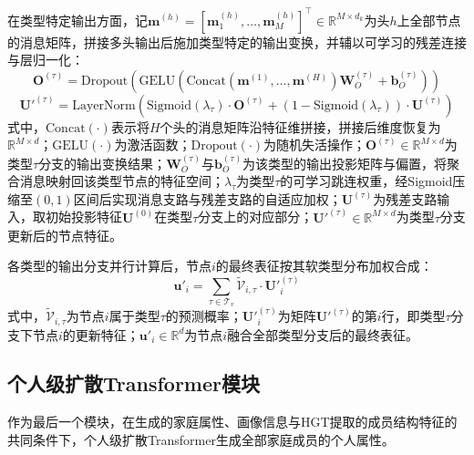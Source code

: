在类型特定输出方面，记$\mathbf{m}^{(h)} = \left[\mathbf{m}_1^{(h)}, \ldots, \mathbf{m}_M^{(h)}\right]^{\top} \in \mathbb{R}^{M \times d_k}$为头$h$上全部节点的消息矩阵，拼接多头输出后施加类型特定的输出变换，并辅以可学习的残差连接与层归一化：
\begin{equation}
  \mathbf{O}^{(\tau)} = \mathrm{Dropout}\left(\mathrm{GELU}\left(\mathrm{Concat}\left(\mathbf{m}^{(1)}, \ldots, \mathbf{m}^{(H)}\right) \mathbf{W}_O^{(\tau)} + \mathbf{b}_O^{(\tau)}\right)\right)
  \label{eq.popsyn.hgtout}
\end{equation}
\begin{equation}
  \mathbf{U}'^{(\tau)} = \mathrm{LayerNorm}\left(\mathrm{Sigmoid}(\lambda_{\tau}) \cdot \mathbf{O}^{(\tau)} + \left(1 - \mathrm{Sigmoid}(\lambda_{\tau})\right) \cdot \mathbf{U}^{(\tau)}\right)
  \label{eq.popsyn.hgtres}
\end{equation}
式中，$\mathrm{Concat}(\cdot)$表示将$H$个头的消息矩阵沿特征维拼接，拼接后维度恢复为$\mathbb{R}^{M \times d}$；$\mathrm{GELU}(\cdot)$为激活函数；$\mathrm{Dropout}(\cdot)$为随机失活操作；$\mathbf{O}^{(\tau)} \in \mathbb{R}^{M \times d}$为类型$\tau$分支的输出变换结果；$\mathbf{W}_O^{(\tau)}$与$\mathbf{b}_O^{(\tau)}$为该类型的输出投影矩阵与偏置，将聚合消息映射回该类型节点的特征空间；$\lambda_{\tau}$为类型$\tau$的可学习跳连权重，经Sigmoid压缩至$(0, 1)$区间后实现消息支路与残差支路的自适应加权；$\mathbf{U}^{(\tau)}$为残差支路输入，取初始投影特征$\mathbf{U}^{(0)}$在类型$\tau$分支上的对应部分；$\mathbf{U}'^{(\tau)} \in \mathbb{R}^{M \times d}$为类型$\tau$分支更新后的节点特征。

 
各类型的输出分支并行计算后，节点$i$的最终表征按其软类型分布加权合成：
\begin{equation}
  \mathbf{u}'_i = \sum_{\tau \in \mathcal{T}_v} \tilde{\mathcal{V}}_{i, \tau} \cdot \mathbf{U}'^{(\tau)}_i
  \label{eq.popsyn.hgtfinal}
\end{equation}
式中，$\tilde{\mathcal{V}}_{i, \tau}$为节点$i$属于类型$\tau$的预测概率；$\mathbf{U}'^{(\tau)}_i$为矩阵$\mathbf{U}'^{(\tau)}$的第$i$行，即类型$\tau$分支下节点$i$的更新特征；$\mathbf{u}'_i \in \mathbb{R}^{d}$为节点$i$融合全部类型分支后的最终表征。
 
\subsection{个人级扩散Transformer模块}\label{subsec.popsyn.model.inddit}
 
作为最后一个模块，在生成的家庭属性、画像信息与HGT提取的成员结构特征的共同条件下，个人级扩散Transformer生成全部家庭成员的个人属性。
 
